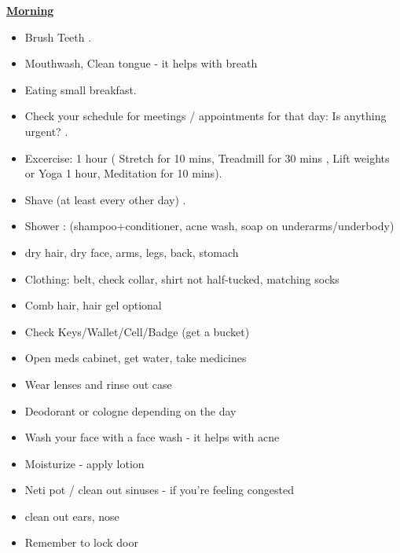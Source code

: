 \begin{columns}
\begin{column}{0.333\columnwidth}
\begin{columns}
\ifdefined\POSTER
\end{columns}
\fi
\underline{\bf Morning}
\begin{itemize}
\tiny \item \tiny Brush Teeth .
\item \tiny Mouthwash, Clean tongue - it helps with breath
\item \tiny Eating small breakfast.
\item \tiny Check your schedule for meetings / appointments for that
day: Is anything urgent? .
\item \tiny Excercise: 1 hour ( Stretch for 10 mins, Treadmill for 30
mins , Lift weights or Yoga 1 hour, Meditation for 10 mins).
\item \tiny Shave (at least every other day) .
\item \tiny Shower : (shampoo+conditioner, acne wash,  soap on
underarms/underbody) 
\item \tiny dry hair, dry face, arms, legs, back, stomach 
\item \tiny Clothing: belt, check collar, shirt not half-tucked,
matching socks 
\item \tiny Comb hair, hair gel optional 
\item \tiny Check Keys/Wallet/Cell/Badge (get a bucket) 
\item \tiny Open meds cabinet, get water, take medicines 
\item \tiny Wear lenses and rinse out case 
\item \tiny Deodorant or cologne depending on the day 
\item \tiny Wash your face with a face wash - it helps with
acne 
\item \tiny Moisturize - apply lotion 
\item \tiny Neti pot / clean out sinuses - if you’re feeling
congested 
\item \tiny clean out ears, nose 
\item \tiny Remember to lock door 
\end{itemize}


\end{column}
\end{columns}
